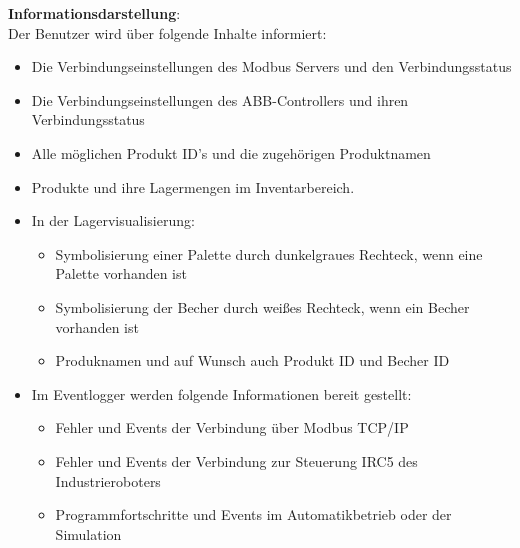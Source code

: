\textbf{Informationsdarstellung}:\\
Der Benutzer wird über folgende Inhalte informiert:\\
\begin{itemize}
    \item Die Verbindungseinstellungen des Modbus Servers und den Verbindungsstatus
    \item Die Verbindungseinstellungen des ABB-Controllers und ihren Verbindungsstatus
    \item Alle möglichen Produkt ID's und die zugehörigen Produktnamen
    \item Produkte und ihre Lagermengen im Inventarbereich.
    \item In der Lagervisualisierung:
    \begin{itemize}
        \item Symbolisierung einer Palette durch dunkelgraues Rechteck, wenn eine Palette vorhanden ist
        \item Symbolisierung der Becher durch weißes Rechteck, wenn ein Becher vorhanden ist
        \item Produknamen und auf Wunsch auch Produkt ID und Becher ID
    \end{itemize}
    \item Im Eventlogger werden folgende Informationen bereit gestellt:
    \begin{itemize}
        \item Fehler und Events der Verbindung über Modbus TCP/IP
        \item Fehler und Events der Verbindung zur Steuerung IRC5 des Industrieroboters
        \item Programmfortschritte und Events im Automatikbetrieb oder der Simulation
    \end{itemize}
\end{itemize}

